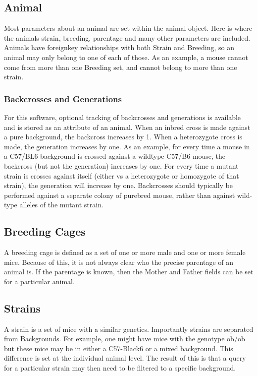\documentclass[letterpaper,10pt,english]{sphinxmanual}
\begin{document}
\subsection{Animal}
\label{api:animal}
Most parameters about an animal are set within the animal object.  Here is where the animals strain, breeding, parentage and many other parameters are included.  Animals have foreignkey relationships with both Strain and Breeding, so an animal may only belong to one of each of those.  As an example, a mouse cannot come from more than one Breeding set, and cannot belong to more than one strain.


\subsubsection{Backcrosses and Generations}
\label{api:backcrosses-and-generations}
For this software, optional tracking of backcrosses and generations is available and is stored as an attribute of an animal.  When an inbred cross is made against a pure background, the backcross increases by 1.  When a heterozygote cross is made, the generation increases by one.  As an example, for every time a mouse in a C57/BL6 background is crossed against a wildtype C57/B6 mouse, the backcross (but not the generation) increases by one.  For every time a mutant strain is crosses against itself (either vs a heterozygote or homozygote of that strain), the generation will increase by one.  Backcrosses should typically be performed against a separate colony of purebred mouse, rather than against wild-type alleles of the mutant strain.


\subsection{Breeding Cages}
\label{api:breeding-cages}
A breeding cage is defined as a set of one or more male and one or more female mice.  Because of this, it is not always clear who the precise parentage of an animal is.  If the parentage is known, then the Mother and Father fields can be set for a particular animal.


\subsection{Strains}
\label{api:strains}
A strain is a set of mice with a similar genetics.  Importantly strains are separated from Backgrounds.  For example, one might have mice with the genotype ob/ob but these mice may be in either a C57-Black6 or a mixed background.  This difference is set at the individual animal level.  
The result of this is that a query for a particular strain may then need to be filtered to a specific background.
\end{document}
